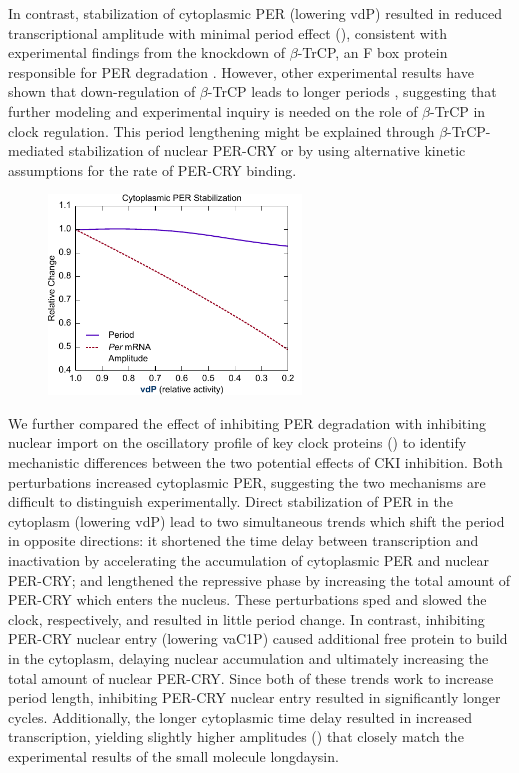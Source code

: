 In contrast, stabilization of cytoplasmic PER (lowering vdP) resulted in reduced transcriptional amplitude with minimal period effect (), consistent with experimental findings from the knockdown of $\beta$-TrCP, an F box protein responsible for PER degradation \cite{Ohsaki2008}. 
However, other experimental results have shown that down-regulation of $\beta$-TrCP leads to longer periods \cite{Reischl2007}, suggesting that further modeling and experimental inquiry is needed on the role of $\beta$-TrCP in clock regulation. 
This period lengthening might be explained through $\beta$-TrCP-mediated stabilization of nuclear PER-CRY or by using alternative kinetic assumptions for the rate of PER-CRY binding. 

\begin{figure}[h]
  \centering
  \includegraphics[width=0.6\textwidth]{chap4/figures/figS3.pdf}
  \label{fig:4S3}
\end{figure}

We further compared the effect of inhibiting PER degradation with inhibiting nuclear import on the oscillatory profile of key clock proteins () to identify mechanistic differences between the two potential effects of CKI inhibition. 
Both perturbations increased cytoplasmic PER, suggesting the two mechanisms are difficult to distinguish experimentally. 
Direct stabilization of PER in the cytoplasm (lowering vdP) lead to two simultaneous trends which shift the period in opposite directions: it shortened the time delay between transcription and inactivation by accelerating the accumulation of cytoplasmic PER and nuclear PER-CRY; and lengthened the repressive phase by increasing the total amount of PER-CRY which enters the nucleus. 
These perturbations sped and slowed the clock, respectively, and resulted in little period change. 
In contrast, inhibiting PER-CRY nuclear entry (lowering vaC1P) caused additional free protein to build in the cytoplasm, delaying nuclear accumulation and ultimately increasing the total amount of nuclear PER-CRY. 
Since both of these trends work to increase period length, inhibiting PER-CRY nuclear entry resulted in significantly longer cycles. 
Additionally, the longer cytoplasmic time delay resulted in increased transcription, yielding slightly higher amplitudes () that closely match the experimental results of the small molecule longdaysin.

